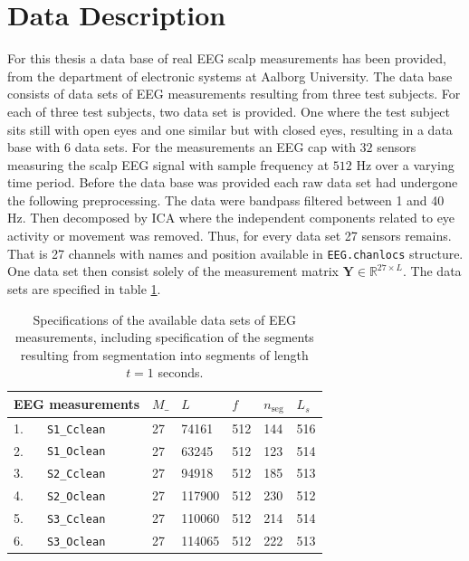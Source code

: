 \section{Data Description}
For this thesis a data base of real EEG scalp measurements has been provided, from the department of electronic systems at Aalborg University. 
The data base consists of data sets of EEG measurements resulting from three test subjects. 
For each of three test subjects, two data set is provided. One where the test subject sits still with open eyes and one similar but with closed eyes, resulting in a data base with 6 data sets. 
For the measurements an EEG cap with $32$ sensors measuring the scalp EEG signal with sample frequency at $512$ Hz over a varying time period.
Before the data base was provided each raw data set had undergone the following preprocessing.
The data were bandpass filtered between 1 and 40 Hz. Then decomposed by ICA where the independent components related to eye activity or movement was removed. 
Thus, for every data set 27 sensors remains. That is 27 channels with names and position available in \texttt{EEG.chanlocs} structure.
One data set then consist solely of the measurement matrix $\mathbf{Y} \in \mathbb{R}^{27\times L}$.
The data sets are specified in table \ref{tab:data_spec}.
\begin{table}[H]
\centering
\begin{tabular}{|l|l|l|l|l|l|l|}
\hline
 \multicolumn{2}{|l|}{EEG measurements } & $M\_$ & $L$    & $f$ & $n_{\text{seg}}$ & $L_s$ \\ \hline
1.& \texttt{S1\_Cclean} & 27  & 74161  & 512   & 144       & 516   \\ \hline
2.& \texttt{S1\_Oclean} & 27  & 63245  & 512   & 123       & 514   \\ \hline
3.& \texttt{S2\_Cclean} & 27  & 94918  & 512   & 185       & 513   \\ \hline
4.& \texttt{S2\_Oclean} & 27  & 117900 & 512   & 230       & 512   \\ \hline
5.& \texttt{S3\_Cclean} & 27  & 110060 & 512   & 214       & 514   \\ \hline
6.& \texttt{S3\_Oclean} & 27  & 114065 & 512   & 222        & 513    \\ \hline
\end{tabular}
\caption{Specifications of the available data sets of EEG measurements, including specification of the segments resulting from segmentation into segments of length $t=1$ seconds.}
\label{tab:data_spec}
\end{table}
\noindent

